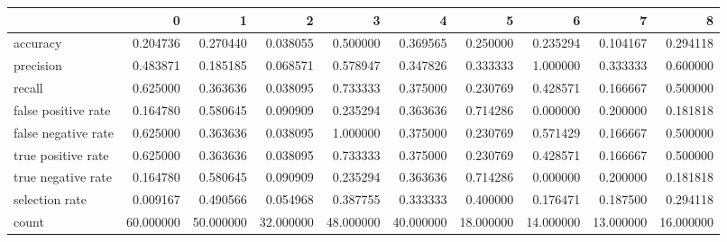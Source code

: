 \begin{tabular}{lrrrrrrrrr}
\toprule
{} &          0 &          1 &          2 &          3 &          4 &          5 &          6 &          7 &          8 \\
\midrule
accuracy            &   0.204736 &   0.270440 &   0.038055 &   0.500000 &   0.369565 &   0.250000 &   0.235294 &   0.104167 &   0.294118 \\
precision           &   0.483871 &   0.185185 &   0.068571 &   0.578947 &   0.347826 &   0.333333 &   1.000000 &   0.333333 &   0.600000 \\
recall              &   0.625000 &   0.363636 &   0.038095 &   0.733333 &   0.375000 &   0.230769 &   0.428571 &   0.166667 &   0.500000 \\
false positive rate &   0.164780 &   0.580645 &   0.090909 &   0.235294 &   0.363636 &   0.714286 &   0.000000 &   0.200000 &   0.181818 \\
false negative rate &   0.625000 &   0.363636 &   0.038095 &   1.000000 &   0.375000 &   0.230769 &   0.571429 &   0.166667 &   0.500000 \\
true positive rate  &   0.625000 &   0.363636 &   0.038095 &   0.733333 &   0.375000 &   0.230769 &   0.428571 &   0.166667 &   0.500000 \\
true negative rate  &   0.164780 &   0.580645 &   0.090909 &   0.235294 &   0.363636 &   0.714286 &   0.000000 &   0.200000 &   0.181818 \\
selection rate      &   0.009167 &   0.490566 &   0.054968 &   0.387755 &   0.333333 &   0.400000 &   0.176471 &   0.187500 &   0.294118 \\
count               &  60.000000 &  50.000000 &  32.000000 &  48.000000 &  40.000000 &  18.000000 &  14.000000 &  13.000000 &  16.000000 \\
\bottomrule
\end{tabular}
